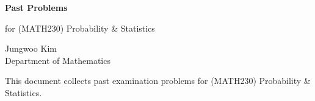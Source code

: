 \documentclass[11pt,oneside]{article}
\begin{document}
\thispagestyle{empty}

\begin{center}
    \vspace*{1.1cm}

    {\LARGE\bfseries Past Problems\par}

    \vspace{0.25cm}

    {\large for (MATH230) Probability \& Statistics\par}

    \vspace{0.75cm}

    {\normalsize
    Jungwoo Kim\\
    Department of Mathematics\\
    \PohangUniversityOfScienceAndTechnology
    \par}
\end{center}

\vspace{0.45cm}

This document collects past examination problems for (MATH230) Probability \& Statistics.
\end{document}
